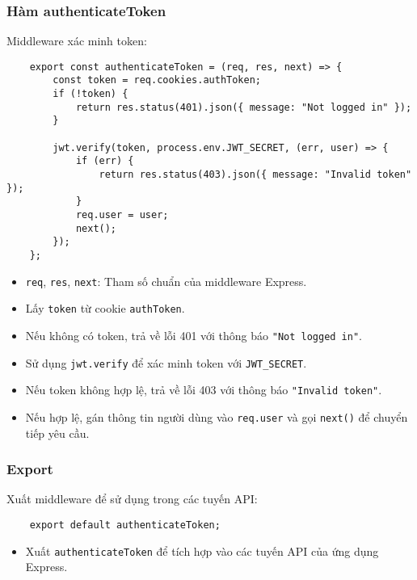             \subsubsection{Hàm authenticateToken}
                \hspace*{0.6cm}Middleware xác minh token:
                \begin{lstlisting}
    export const authenticateToken = (req, res, next) => {
        const token = req.cookies.authToken;
        if (!token) {
            return res.status(401).json({ message: "Not logged in" });
        }

        jwt.verify(token, process.env.JWT_SECRET, (err, user) => {
            if (err) {
                return res.status(403).json({ message: "Invalid token" });
            }
            req.user = user;
            next();
        });
    };
                \end{lstlisting}
                \begin{itemize}
                    \item \texttt{req}, \texttt{res}, \texttt{next}: Tham số chuẩn của middleware Express.
                    \item Lấy \texttt{token} từ cookie \texttt{authToken}.
                    \item Nếu không có token, trả về lỗi 401 với thông báo \texttt{"Not logged in"}.
                    \item Sử dụng \texttt{jwt.verify} để xác minh token với \texttt{JWT\_SECRET}.
                    \item Nếu token không hợp lệ, trả về lỗi 403 với thông báo \texttt{"Invalid token"}.
                    \item Nếu hợp lệ, gán thông tin người dùng vào \texttt{req.user} và gọi \texttt{next()} để chuyển tiếp yêu cầu.
                \end{itemize}

            \subsubsection{Export}
                \hspace*{0.6cm}Xuất middleware để sử dụng trong các tuyến API:
                \begin{lstlisting}
    export default authenticateToken;
                \end{lstlisting}
                \begin{itemize}
                    \item Xuất \texttt{authenticateToken} để tích hợp vào các tuyến API của ứng dụng Express.
                \end{itemize}

